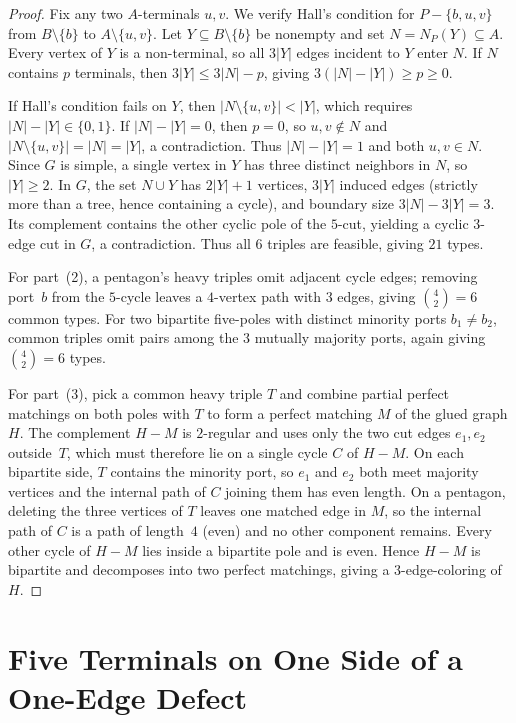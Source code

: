 \documentclass[11pt]{article}
\theoremstyle{remark}
\begin{document}
\begin{proof}
Fix any two $A$-terminals $u, v$. We verify Hall's condition for $P - \{b, u, v\}$ from
$B \setminus \{b\}$ to $A \setminus \{u, v\}$. Let $Y \subseteq B \setminus \{b\}$ be
nonempty and set $N = N_P(Y) \subseteq A$. Every vertex of $Y$ is a non-terminal, so all
$3|Y|$ edges incident to $Y$ enter $N$. If $N$ contains $p$ terminals, then
$3|Y| \le 3|N| - p$, giving $3(|N| - |Y|) \ge p \ge 0$.

If Hall's condition fails on $Y$, then $|N \setminus \{u,v\}| < |Y|$, which requires
$|N| - |Y| \in \{0, 1\}$. If $|N| - |Y| = 0$, then $p = 0$, so $u, v \notin N$ and
$|N \setminus \{u,v\}| = |N| = |Y|$, a contradiction. Thus $|N| - |Y| = 1$ and both
$u, v \in N$. Since $G$ is simple, a single vertex in $Y$ has three distinct neighbors in
$N$, so $|Y| \ge 2$. In $G$, the set $N \cup Y$ has $2|Y| + 1$ vertices, $3|Y|$ induced
edges (strictly more than a tree, hence containing a cycle), and boundary size
$3|N| - 3|Y| = 3$. Its complement contains the other cyclic pole of the $5$-cut, yielding
a cyclic $3$-edge cut in $G$, a contradiction. Thus all $6$ triples are feasible, giving
$21$ types.

For part~(2), a pentagon's heavy triples omit adjacent cycle edges; removing port~$b$
from the $5$-cycle leaves a $4$-vertex path with $3$ edges, giving $\binom{4}{2} = 6$
common types. For two bipartite five-poles with distinct minority ports $b_1 \neq b_2$,
common triples omit pairs among the $3$ mutually majority ports, again giving
$\binom{4}{2} = 6$ types.

For part~(3), pick a common heavy triple $T$ and combine partial perfect matchings on
both poles with $T$ to form a perfect matching $M$ of the glued graph $H$. The
complement $H - M$ is $2$-regular and uses only the two cut edges $e_1, e_2$ outside~$T$,
which must therefore lie on a single cycle $C$ of $H - M$. On each bipartite side, $T$
contains the minority port, so $e_1$ and $e_2$ both meet majority vertices and the
internal path of $C$ joining them has even length. On a pentagon, deleting the three
vertices of $T$ leaves one matched edge in $M$, so the internal path of $C$ is a path of
length~$4$ (even) and no other component remains. Every other cycle of $H - M$ lies inside
a bipartite pole and is even. Hence $H - M$ is bipartite and decomposes into two perfect
matchings, giving a $3$-edge-coloring of $H$.
\end{proof}

\section{Five Terminals on One Side of a One-Edge Defect}
\end{document}

